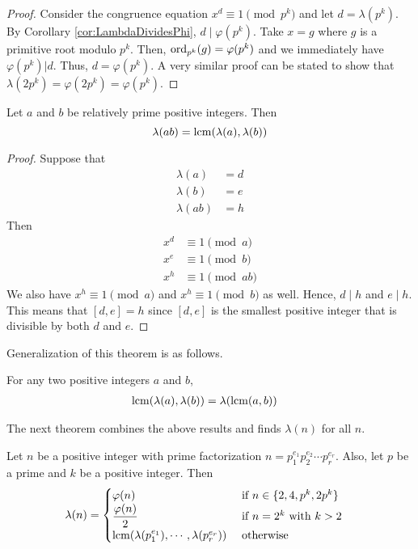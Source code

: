 \documentclass{subfile}
\begin{document}
	\begin{proof}
		Consider the congruence equation $x^d\equiv1\pmod{p^k}$ and let $d=\lambda(p^k)$. By Corollary \ref{cor:LambdaDividesPhi}, $d \mid \varphi(p^k)$. Take $x=g$ where $g$ is a primitive root modulo $p^k$. Then, $\operatorname{ord}_{p^k}(g)=\varphi(p^k)$ and we immediately have $\varphi(p^k)|d$. Thus, $d=\varphi(p^k)$. A very similar proof can be stated to show that $\lambda (2p^k)=\varphi (2p^k) = \varphi(p^k)$.
	\end{proof}

	\begin{theorem}
		Let $a$ and $b$ be relatively prime positive integers. Then
		 \[\lambda(ab)=\operatorname{lcm}(\lambda(a),\lambda(b))\]
	\end{theorem}

	\begin{proof}
		Suppose that
			\begin{align*}
				\lambda(a)
					& =d\\
				\lambda(b)
					& =e\\
				\lambda(ab)
					& =h
			\end{align*}
		Then
			\begin{align*}
				x^d
					& \equiv1\pmod a\\
				x^e
					& \equiv1\pmod b\\
				x^{h}
					& \equiv1\pmod{ab}
			\end{align*}
		We also have $x^h\equiv1\pmod a$ and $x^h\equiv1\pmod b$ as well. Hence, $d \mid h$ and $e \mid h$. This means that $[d,e]=h$ since $[d,e]$ is the smallest positive integer that is divisible by both $d$ and $e$.
	\end{proof}
	Generalization of this theorem is as follows.
	\begin{theorem}
		For any two positive integers $a$ and $b$,
		\begin{align*}
		\operatorname{lcm}(\lambda(a),\lambda(b)) & = \lambda(\operatorname{lcm}(a,b))
		\end{align*}
	\end{theorem}
	The next theorem combines the above results and finds $\lambda(n)$ for all $n$.
	\begin{theorem}\label{thm:CarmichaelFormula}
		Let $n$ be a positive integer with prime factorization $n=p_1^{e_1}p_2^{e_2}\cdots p_r^{e_r}$. Also, let $p$ be a prime and $k$ be a positive integer. Then
		\begin{align*}
			\lambda(n) & =
				\begin{cases}
					\varphi(n)& \mbox{ if } n\in\{2,4,p^k,2p^k\}\\
					\dfrac{\varphi(n)}{2}& \mbox{ if }n=2^k\mbox{ with }k>2\\
					\operatorname{lcm}(\lambda(p_1^{e_1}),\cdots,\lambda(p_r^{e_r}))& \mbox{ otherwise}
				\end{cases}
		\end{align*}
	\end{theorem}
\end{document}

